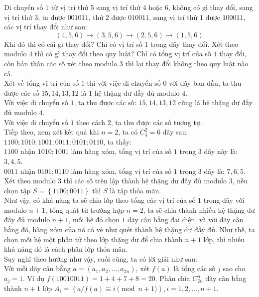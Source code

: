 \begin{bt}
{		Di chuyển số $1$ từ vị trí thứ $5$ sang vị trí thứ $4$ hoặc $6$, không có gì thay đổi, sang vị trí thứ $3$, ta được $001011$, thứ $2$ được $010011$, sang vị trí thứ $1$ được $100011$, các vị trí thay đổi như sau:  	
		$$\left( 4, 5, 6\right) \longrightarrow \left( 3, 5, 6\right) \longrightarrow \left( 2, 5, 6\right) \longrightarrow \left( 1, 5, 6\right)$$ 
		Khi đó thì có cái gì thay đổi? Chỉ có vị trí số $1$ trong dãy thay đổi. Xét theo modulo $4$ thì có gì thay đổi theo quy luật? Chỉ có tổng vị trí của số $1$ thay đổi, còn bản thân các số xét theo modulo $3$ thì lại thay đổi không theo quy luật nào cả. \\
		Xét về tổng vị trí của số $1$ thì với việc di chuyển số $0$ với dãy ban đầu, ta thu được các số
		$15,14,13,12$ là $1$ hệ thặng dư đầy đủ modulo $4$.\\
		Với việc di chuyển số $1$, ta thu được các số: $15, 14,13,12$ cũng là hệ thặng dư đầy đủ modulo $4$.\\
		Với việc di chuyển số $1$ theo cách $2$, ta thu được các số tương tự.\\
		Tiếp theo, xem xét kết quả khi $n=2$,  ta có $C^2_4 =6$ dãy sau: $1100; 1010; 1001; 0011; 0101; 0110$, ta thấy: \\
		$1100$ nhận $1010; 1001$ làm hàng xóm, tổng vị trí của số $1$ trong $3$ dãy này là: $3,4,5$.\\
		$0011$ nhận $0101; 0110$ làm hàng xóm, tổng vị trí của số $1$ trong  $3$ dãy là: $7,6,5$.\\
		Xét theo modulo $3$ thì các số trên lập thành hệ thặng dư đầy đủ modulo $3$, nếu chọn tập $S=\left\lbrace 1100; 0011\right\rbrace $ thì $S$ là tập thỏa mãn.\\
		Như vậy, có khả năng ta sẽ chia lớp theo tổng các vị trí của số $1$ trong dãy với modulo $n+1$, tổng quát từ trường hợp $n=2$, ta sẽ chia thành nhiều hệ thặng dư đầy đủ modulo $n+1$, mỗi hệ đó chọn $1$ dãy cân bằng đại diện, và với dãy cân bằng đó, hàng xóm của nó có vẻ như quét thành hệ thặng dư đầy đủ. Như thế, ta chọn mỗi hệ một phần tử theo lớp thặng dư để chia thành $n+1$ lớp, thì nhiều khả năng đó là cách phân lớp thỏa mãn. \\
		Suy nghĩ theo hướng như vậy, cuối cùng, ta có lời giải như sau: \\
		Với mỗi dãy cân bằng $a = \left( a_1, a_2,\ldots, a_{2n}\right) $, xét $f(a)$ là tổng các số $j$ sao cho $a_j = 1$. Ví dụ $f\left( 10010011\right) = 1 +4 + 7 + 8 = 20$. Phân chia $C^n_{2n}$  dãy cân bằng thành $n+1$ lớp $A_i = \left\lbrace a/f(a) \equiv i \pmod{n+1}\right\rbrace , i = 1, 2,\ldots, n+1$. \\
}
\end{bt}
